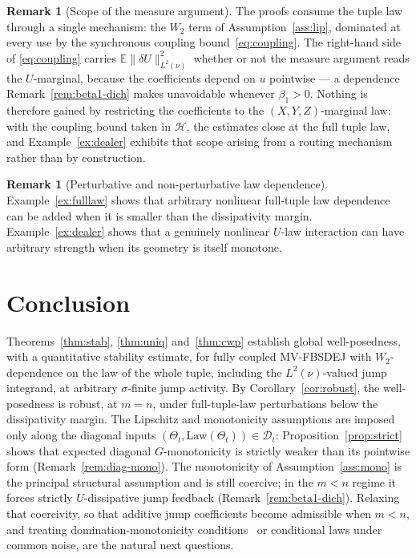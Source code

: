 \documentclass[preprint,12pt]{elsarticle}
\newcommand{\E}{\mathbb{E}}
\newcommand{\Lnu}{L^2(\nu)}
\newcommand{\Law}{\mathrm{Law}}
\newcommand{\Lnorm}[1]{\lVert #1\rVert_{\Lnu}}
\numberwithin{equation}{section}
\theoremstyle{plain}
\theoremstyle{definition}
\theoremstyle{\PaperRemarkStyle}
\newtheorem{remark}[theorem]{Remark}
\begin{document}
\begin{remark}[Scope of the measure argument]\label{rem:freelaw}
The proofs consume the tuple law through a single mechanism: the $W_2$ term of
Assumption~\ref{ass:lip}, dominated at every use by the synchronous coupling
bound~\eqref{eq:coupling}. The right-hand side of \eqref{eq:coupling} carries
$\E\Lnorm{\delta U}^2$ whether or not the measure argument reads the $U$-marginal,
because the coefficients depend on $u$ pointwise --- a dependence
Remark~\ref{rem:beta1-dich} makes unavoidable whenever $\beta_1>0$. Nothing is therefore gained by restricting the
coefficients to the $(X,Y,Z)$-marginal law: with the coupling bound taken in
$\mathcal H$, the estimates close at the full tuple law, and Example~\ref{ex:dealer}
exhibits that scope arising from a routing mechanism rather than by construction.
\end{remark}

\begin{remark}[Perturbative and non-perturbative law dependence]\label{rem:regimes}
Example~\ref{ex:fulllaw} shows that arbitrary nonlinear full-tuple law dependence can be
added when it is smaller than the dissipativity margin. Example~\ref{ex:dealer} shows
that a genuinely nonlinear $U$-law interaction can have arbitrary strength when its
geometry is itself monotone.
\end{remark}

 \section{Conclusion}\label{sec:conclusion}

Theorems~\ref{thm:stab}, \ref{thm:uniq} and~\ref{thm:cwp} establish global well-posedness, with a quantitative
stability estimate, for fully coupled MV-FBSDEJ with $W_2$-dependence on the law of the whole
tuple, including the $\Lnu$-valued jump integrand, at arbitrary $\sigma$-finite jump activity.
By Corollary~\ref{cor:robust}, the well-posedness is robust, at $m=n$, under full-tuple-law
perturbations below the dissipativity margin. The Lipschitz and monotonicity assumptions are imposed only along the diagonal inputs
$(\Theta_t,\Law(\Theta_t))\in\mathcal D_t$:
Proposition~\ref{prop:strict} shows that expected diagonal $G$-monotonicity is strictly
weaker than its pointwise form (Remark~\ref{rem:diag-mono}). The monotonicity of
Assumption~\ref{ass:mono} is the principal structural assumption and is still coercive; in the $m<n$ regime it
forces strictly $U$-dissipative jump feedback (Remark~\ref{rem:beta1-dich}). Relaxing that coercivity, so that additive jump coefficients
become admissible when $m<n$, and treating domination-monotonicity
conditions~\cite{TianYu,WuHao} or conditional laws under common noise, are the natural next
questions.
\end{document}
